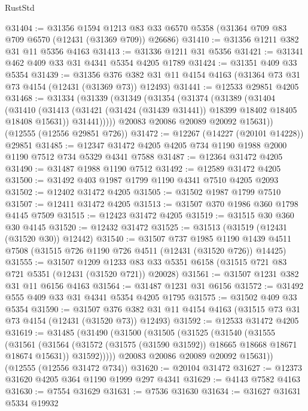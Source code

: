 \begin{lexlean}{RustStd}
\begin{coremodule}
@31404 := @31356
    @1594
    @1213
    @83
    @33
    @6570
    @5358
    (@31364 @709 @83 @709 @6570 (@12431 (@31369 @709)) @26686)
@31410 := @31356 @1211 @382 @31 @11 @5356 @4163
@31413 := @31336 @1211 @31 @5356
@31421 := @31341 @462 @409 @33 @31 @4341 @5354 @4205 @1789
@31424 := @31351 @409 @33 @5354
@31439 := @31356
    @376
    @382
    @31
    @11
    @4154
    @4163
    (@31364 @73 @31 @73 @4154 (@12431 (@31369 @73)) @12493)
@31441 := @12533 @29851 @4205
@31468 := @31334
    (@31339
      (@31349
        (@31354
          (@31374
            (@31389
              (@31404
                (@31410
                  (@31413 (@31421 (@31424 (@31439 @31441)) @18399 @18402 @18405 @18408 @15631))
                  @31441)))))
        @20083
        @20086
        @20089
        @20092
        @15631))
    (@12555 (@12556 @29851 @726))
@31472 := @12267 (@14227 (@20101 @14228)) @29851
@31485 := @12347 @31472 @4205 @4205 @734 @1190 @1988 @2000 @1190 @7512 @734 @5329 @4341 @7588
@31487 := @12364 @31472 @4205
@31490 := @31487 @1988 @1190 @7512
@31492 := @12589 @31472 @4205
@31500 := @31492 @403 @1987 @1799 @1190 @4341 @7510 @4205 @2093
@31502 := @12402 @31472 @4205
@31505 := @31502 @1987 @1799 @7510
@31507 := @12411 @31472 @4205
@31513 := @31507 @370 @1986 @360 @1798 @4145 @7509
@31515 := @12423 @31472 @4205
@31519 := @31515 @30 @360 @30 @4145
@31520 := @12432 @31472
@31525 := @31513 (@31519 (@12431 (@31520 @30)) @12442)
@31540 := @31507
    @737
    @1985
    @1190
    @1439
    @4511
    @7508
    (@31515 @726 @1190 @726 @4511 (@12431 (@31520 @726)) @14425)
@31555 := @31507
    @1209
    @1233
    @83
    @33
    @5351
    @6158
    (@31515 @721 @83 @721 @5351 (@12431 (@31520 @721)) @20028)
@31561 := @31507 @1231 @382 @31 @11 @6156 @4163
@31564 := @31487 @1231 @31 @6156
@31572 := @31492 @555 @409 @33 @31 @4341 @5354 @4205 @1795
@31575 := @31502 @409 @33 @5354
@31590 := @31507
    @376
    @382
    @31
    @11
    @4154
    @4163
    (@31515 @73 @31 @73 @4154 (@12431 (@31520 @73)) @12493)
@31592 := @12533 @31472 @4205
@31619 := @31485
    (@31490
      (@31500
        (@31505
          (@31525
            (@31540
              (@31555
                (@31561
                  (@31564 (@31572 (@31575 (@31590 @31592)) @18665 @18668 @18671 @18674 @15631))
                  @31592)))))
        @20083
        @20086
        @20089
        @20092
        @15631))
    (@12555 (@12556 @31472 @734))
@31620 := @20104 @31472
@31627 := @12373 @31620 @4205 @364 @1190 @1999 @297 @4341
@31629 := @4143 @7582 @4163
@31630 := @7554 @31629
@31631 := @7536 @31630
@31634 := @31627 @31631 @5334 @19932

\end{coremodule}
\end{lexlean}
